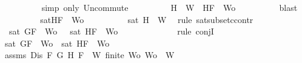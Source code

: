 \begin{isabellebody}
\ \ \ \ \ \ \ \ \isamarkupfalse%
\ {\isacharparenleft}simp\ only{\isacharcolon}\ Un{\isacharunderscore}commute{\isacharparenright}\isanewline
\ \ \ \ \ \ \isamarkupfalse%
\ \isamarkupfalse%
\ {\isachardoublequoteopen}{\isacharbraceleft}H{\isacharbraceright}\ {\isasymunion}\ W{}\ {\isasymsubseteq}\ {\isacharbraceleft}H{\isacharcomma}F{\isacharbraceright}\ {\isasymunion}\ {\isacharquery}Wo{\isachardoublequoteclose}\isanewline
\ \ \ \ \ \ \ \ \isamarkupfalse%
\ blast\isanewline
\ \ \ \ \ \ \isamarkupfalse%
\ \isamarkupfalse%
\ {}{\isacharcolon}{\isachardoublequoteopen}{\isasymnot}{\isacharparenleft}sat{\isacharparenleft}{\isacharbraceleft}H{\isacharcomma}F{\isacharbraceright}\ {\isasymunion}\ {\isacharquery}Wo{\isacharparenright}{\isacharparenright}{\isachardoublequoteclose}\isanewline
\ \ \ \ \ \ \ \ \isamarkupfalse%
\ {\isacartoucheopen}{\isasymnot}sat\ {\isacharparenleft}{\isacharbraceleft}H{\isacharbraceright}\ {\isasymunion}\ W{}{\isacharparenright}{\isacartoucheclose}\ \isamarkupfalse%
\ {\isacharparenleft}rule\ sat{\isacharunderscore}subset{\isacharunderscore}ccontr{\isacharparenright}\isanewline
\ \ \ \ \ \ \isamarkupfalse%
\ {\isachardoublequoteopen}{\isasymnot}\ sat\ {\isacharparenleft}{\isacharbraceleft}G{\isacharcomma}F{\isacharbraceright}\ {\isasymunion}\ {\isacharquery}Wo{\isacharparenright}\ {\isasymand}\ {\isasymnot}\ sat\ {\isacharparenleft}{\isacharbraceleft}H{\isacharcomma}F{\isacharbraceright}\ {\isasymunion}\ {\isacharquery}Wo{\isacharparenright}{\isachardoublequoteclose}\isanewline
\ \ \ \ \ \ \ \ \isamarkupfalse%
\ {}\ {}\ \isamarkupfalse%
\ {\isacharparenleft}rule\ conjI{\isacharparenright}\isanewline
\ \ \ \ \ \ \isamarkupfalse%
\ {\isachardoublequoteopen}sat\ {\isacharparenleft}{\isacharbraceleft}G{\isacharcomma}F{\isacharbraceright}\ {\isasymunion}\ {\isacharquery}Wo{\isacharparenright}\ {\isasymor}\ sat\ {\isacharparenleft}{\isacharbraceleft}H{\isacharcomma}F{\isacharbraceright}\ {\isasymunion}\ {\isacharquery}Wo{\isacharparenright}{\isachardoublequoteclose}\isanewline
\ \ \ \ \ \ \ \ \isamarkupfalse%
\ assms{\isacharparenleft}{}{\isacharparenright}\ {\isacartoucheopen}Dis\ F\ G\ H{\isacartoucheclose}\ {\isacartoucheopen}F\ {\isasymin}\ W{\isacartoucheclose}\ {\isacartoucheopen}finite\ {\isacharquery}Wo{\isacartoucheclose}\ {\isacartoucheopen}{\isacharquery}Wo\ {\isasymsubseteq}\ W{\isacartoucheclose}\ \isamarkupfalse%

\end{isabellebody}
